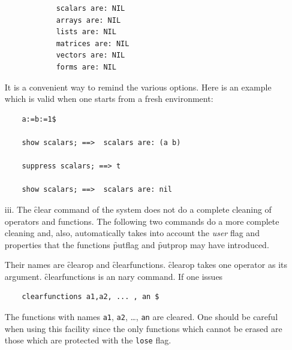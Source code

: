\begin{itemize}
\begin{verbatim}
            scalars are: NIL
            arrays are: NIL
            lists are: NIL
            matrices are: NIL
            vectors are: NIL
            forms are: NIL
\end{verbatim}
It is a convenient way to remind the various options. Here is an example
which is valid when one starts from a fresh environment:
\begin{verbatim}
    a:=b:=1$

    show scalars; ==>  scalars are: (a b)

    suppress scalars; ==> t

    show scalars; ==>  scalars are: nil
\end{verbatim}
\item[iii.]
The \f{clear} command  of the system does not do a complete cleaning of
operators and functions. The following two commands do a more
complete cleaning and, also, automatically takes into account the
\emph{user} flag and properties that the functions
\f{putflag} and \f{putprop} may have introduced.

%
%
\hypertarget{operator:CLEAROP}{}%
\hypertarget{operator:CLEARFUNCTIONS}{}%
Their names are \f{clearop} and \f{clearfunctions}.
\f{clearop} takes one operator as its argument.
\f{clearfunctions} is an nary command. If one issues
\begin{verbatim}
    clearfunctions a1,a2, ... , an $
\end{verbatim}
The functions with names \texttt{a1}, \texttt{a2}, \ldots, \texttt{an} are cleared.
One should be careful when  using this facility since the
only functions which cannot be erased are those which are
protected with the \texttt{lose} flag.
\end{itemize}
